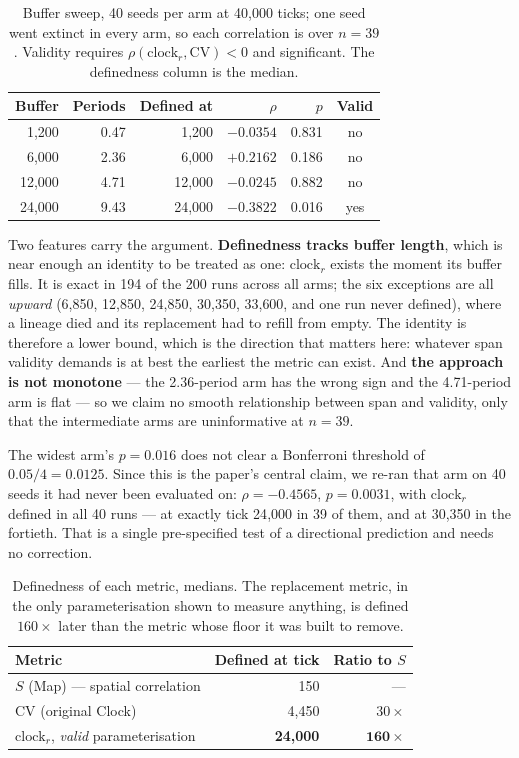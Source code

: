 \documentclass[11pt,letterpaper]{article}
\begin{document}
\begin{table}[H]
\centering
\caption{Buffer sweep, 40 seeds per arm at 40{,}000 ticks; one seed
went extinct in every arm, so each correlation is over $n = 39$.
Validity requires $\rho(\mathrm{clock}_r, \mathrm{CV}) < 0$ and
significant. The definedness column is the median.}
\begin{tabular}{rrrrrc}
\toprule
Buffer & Periods & Defined at & $\rho$ & $p$ & Valid \\
\midrule
1{,}200  & 0.47 & 1{,}200  & $-0.0354$ & 0.831 & no \\
6{,}000  & 2.36 & 6{,}000  & $+0.2162$ & 0.186 & no \\
12{,}000 & 4.71 & 12{,}000 & $-0.0245$ & 0.882 & no \\
24{,}000 & 9.43 & 24{,}000 & $\mathbf{-0.3822}$ & 0.016 & yes \\
\bottomrule
\end{tabular}
\end{table}

Two features carry the argument. \textbf{Definedness tracks buffer
length}, which is near enough an identity to be treated as one:
$\mathrm{clock}_r$ exists the moment its buffer fills. It is exact in
194 of the 200 runs across all arms; the six exceptions are all
\emph{upward} (6{,}850, 12{,}850, 24{,}850, 30{,}350, 33{,}600, and one
run never defined), where a lineage died and its replacement had to
refill from empty. The identity is therefore a lower bound, which is the
direction that matters here: whatever span validity demands is at best
the earliest the metric can exist. And \textbf{the approach is not
monotone} --- the 2.36-period arm has the wrong sign and the 4.71-period
arm is flat --- so we claim no smooth relationship between span and
validity, only that the intermediate arms are uninformative at
$n = 39$.

The widest arm's $p = 0.016$ does not clear a Bonferroni threshold of
$0.05/4 = 0.0125$. Since this is the paper's central claim, we re-ran
that arm on 40 seeds it had never been evaluated on:
$\rho = -0.4565$, $p = 0.0031$, with $\mathrm{clock}_r$ defined in all
40 runs --- at exactly tick 24{,}000 in 39 of them, and at 30{,}350 in
the fortieth. That is a single pre-specified test of a
directional prediction and needs no correction.

\begin{table}[H]
\centering
\caption{Definedness of each metric, medians. The replacement metric,
in the only parameterisation shown to measure anything, is defined
$160\times$ later than the metric whose floor it was built to remove.}
\begin{tabular}{lrr}
\toprule
Metric & Defined at tick & Ratio to $S$ \\
\midrule
$S$ (Map) --- spatial correlation & 150 & --- \\
CV (original Clock) & 4{,}450 & $30\times$ \\
$\mathrm{clock}_r$, \emph{valid} parameterisation
  & \textbf{24{,}000} & $\mathbf{160\times}$ \\
\bottomrule
\end{tabular}
\end{table}
\end{document}

